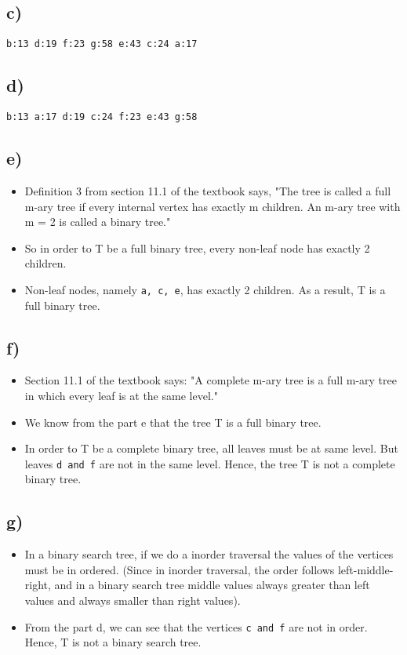 \documentclass[11pt]{article}
\begin{document}
\subsection*{c)}
    \texttt{b:13 d:19 f:23 g:58 e:43 c:24 a:17}
    
\subsection*{d)}
    \texttt{b:13 a:17 d:19 c:24 f:23 e:43 g:58 }

\subsection*{e)}
    \begin{itemize}
        \item Definition 3 from section 11.1 of the textbook says, "The tree is called a full m-ary tree if every internal vertex has exactly m children. An m-ary tree with m = 2 is called a binary tree."
        \item So in order to T be a full binary tree, every non-leaf node has exactly 2 children.
        \item Non-leaf nodes, namely \texttt{a, c, e}, has exactly 2 children. As a result, T is a full binary tree.
    \end{itemize}{}
    
\subsection*{f)}
    \begin{itemize}
        \item Section 11.1 of the textbook says: "A complete m-ary tree is a full m-ary tree in which every leaf is at the same level."
        \item We know from the part e that the tree T is a full binary tree.
        \item In order to T be a complete binary tree, all leaves must be at same level. But leaves \texttt{d and f} are not in the same level. Hence, the tree T is not a complete binary tree.
    \end{itemize}{}
    
\subsection*{g)}
    \begin{itemize}
        \item In a binary search tree, if we do a inorder traversal the values of the vertices must be in ordered. (Since in inorder traversal, the order follows left-middle-right, and in a binary search tree middle values always greater than left values and always smaller than right values).
        \item From the part d, we can see that the vertices \texttt{c and f} are not in order. Hence, T is not a binary search tree.
    \end{itemize}{}
    
\end{document}
